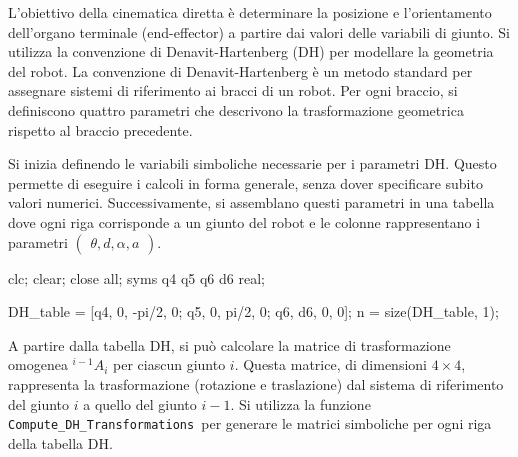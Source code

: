 \documentclass[11pt, a4paper]{article}
\begin{document}

\begin{par}
\begin{flushleft}
L'obiettivo della cinematica diretta è determinare la posizione e l'orientamento dell'organo terminale (end-effector) a partire dai valori delle variabili di giunto. Si utilizza la convenzione di Denavit-Hartenberg (DH) per modellare la geometria del robot. La convenzione di Denavit-Hartenberg è un metodo standard per assegnare sistemi di riferimento ai bracci di un robot. Per ogni braccio, si definiscono quattro parametri che descrivono la trasformazione geometrica rispetto al braccio precedente.
\end{flushleft}
\end{par}

\begin{par}
\begin{flushleft}
Si inizia definendo le variabili simboliche necessarie per i parametri DH. Questo permette di eseguire i calcoli in forma generale, senza dover specificare subito valori numerici. Successivamente, si assemblano questi parametri in una tabella dove ogni riga corrisponde a un giunto del robot e le colonne rappresentano i parametri $\left(\begin{array}{c}
\theta ,d,\alpha ,a
\end{array}\right)$.
\end{flushleft}
\end{par}

\begin{matlabcode}
clc;
clear;
close all;
syms q4 q5 q6 d6 real;

DH_table = [q4, 0, -pi/2, 0;
            q5, 0, pi/2, 0;
            q6, d6, 0, 0];
n = size(DH_table, 1);
\end{matlabcode}

\begin{par}
\begin{flushleft}
A partire dalla tabella DH, si può calcolare la matrice di trasformazione omogenea $^{i-1} A_i$ per ciascun giunto $i$. Questa matrice, di dimensioni $4\times 4$, rappresenta la trasformazione (rotazione e traslazione) dal sistema di riferimento del giunto $i$ a quello del giunto $i-1$. Si utilizza la funzione \texttt{Compute\_DH\_Transformations }per generare le matrici simboliche per ogni riga della tabella DH.
\end{flushleft}
\end{par}
\end{document}
